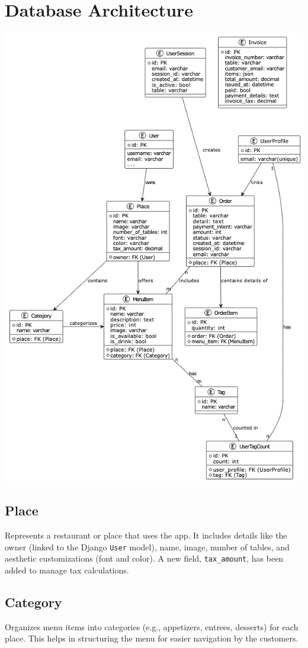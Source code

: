\section{Database Architecture}
\includegraphics[width=1\textwidth]{images/databasediagram.png}

\subsection{Place}
Represents a restaurant or place that uses the app. It includes details like the owner (linked to the Django \texttt{User} model), name, image, number of tables, and aesthetic customizations (font and color). A new field, \texttt{tax\_amount}, has been added to manage tax calculations.

\subsection{Category}
Organizes menu items into categories (e.g., appetizers, entrees, desserts) for each place. This helps in structuring the menu for easier navigation by the customers.

